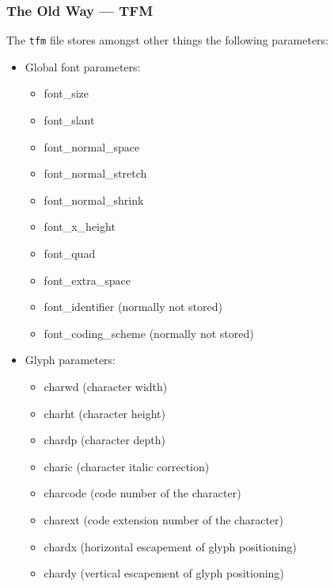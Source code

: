 \documentclass{scrartcl}
\begin{document}
\subsubsection{The Old Way --- TFM}
%
The \texttt{tfm} file stores amongst other things the following parameters:
\begin{itemize}
	\item Global font parameters:
	\begin{itemize}
		\item font\_size
		\item font\_slant
		\item font\_normal\_space
		\item font\_normal\_stretch
		\item font\_normal\_shrink
		\item font\_x\_height
		\item font\_quad
		\item font\_extra\_space
		\item font\_identifier (normally not stored)
		\item font\_coding\_scheme (normally not stored)
	\end{itemize}
	\item Glyph parameters:
	\begin{itemize}
		\item charwd (character width)
		\item charht (character height)
		\item chardp (character depth)
		\item charic (character italic correction)
		\item charcode (code number of the character)
		\item charext (code extension number of the character)
		\item chardx (horizontal escapement of glyph positioning)
		\item chardy (vertical escapement of glyph positioning)
	\end{itemize}
\end{itemize}
%
\end{document}
